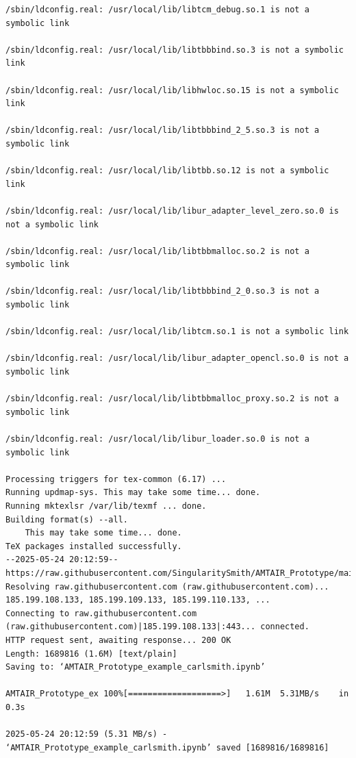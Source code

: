 \documentclass[
  11pt,
  letterpaper,
]{book}
\begin{document}
\begin{verbatim}
/sbin/ldconfig.real: /usr/local/lib/libtcm_debug.so.1 is not a symbolic link

/sbin/ldconfig.real: /usr/local/lib/libtbbbind.so.3 is not a symbolic link

/sbin/ldconfig.real: /usr/local/lib/libhwloc.so.15 is not a symbolic link

/sbin/ldconfig.real: /usr/local/lib/libtbbbind_2_5.so.3 is not a symbolic link

/sbin/ldconfig.real: /usr/local/lib/libtbb.so.12 is not a symbolic link

/sbin/ldconfig.real: /usr/local/lib/libur_adapter_level_zero.so.0 is not a symbolic link

/sbin/ldconfig.real: /usr/local/lib/libtbbmalloc.so.2 is not a symbolic link

/sbin/ldconfig.real: /usr/local/lib/libtbbbind_2_0.so.3 is not a symbolic link

/sbin/ldconfig.real: /usr/local/lib/libtcm.so.1 is not a symbolic link

/sbin/ldconfig.real: /usr/local/lib/libur_adapter_opencl.so.0 is not a symbolic link

/sbin/ldconfig.real: /usr/local/lib/libtbbmalloc_proxy.so.2 is not a symbolic link

/sbin/ldconfig.real: /usr/local/lib/libur_loader.so.0 is not a symbolic link

Processing triggers for tex-common (6.17) ...
Running updmap-sys. This may take some time... done.
Running mktexlsr /var/lib/texmf ... done.
Building format(s) --all.
    This may take some time... done.
TeX packages installed successfully.
--2025-05-24 20:12:59--  https://raw.githubusercontent.com/SingularitySmith/AMTAIR_Prototype/main/data/example_carlsmith/AMTAIR_Prototype_example_carlsmith.ipynb
Resolving raw.githubusercontent.com (raw.githubusercontent.com)... 185.199.108.133, 185.199.109.133, 185.199.110.133, ...
Connecting to raw.githubusercontent.com (raw.githubusercontent.com)|185.199.108.133|:443... connected.
HTTP request sent, awaiting response... 200 OK
Length: 1689816 (1.6M) [text/plain]
Saving to: ‘AMTAIR_Prototype_example_carlsmith.ipynb’

AMTAIR_Prototype_ex 100%[===================>]   1.61M  5.31MB/s    in 0.3s    

2025-05-24 20:12:59 (5.31 MB/s) - ‘AMTAIR_Prototype_example_carlsmith.ipynb’ saved [1689816/1689816]
\end{verbatim}


\backmatter
\printbibliography[title=Bibliography]
\end{document}

